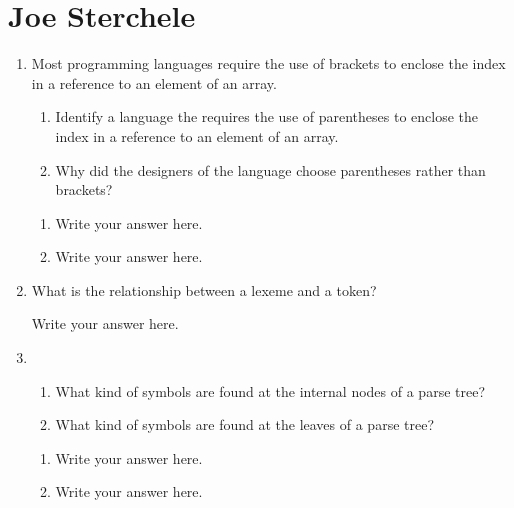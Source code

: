 
\chapter{Joe Sterchele}

\begin{enumerate}
  \item Most programming languages require the use of brackets to
    enclose the index in a reference to an element of an array.
  \begin{enumerate}
    \item Identify a language the requires the use of parentheses
      to enclose the index in a reference to an element of an array.
    \item Why did the designers of the language choose parentheses
      rather than brackets?
    \end{enumerate}

  \begin{answer}

  \begin{enumerate}
    \item Write your answer here.
    \item Write your answer here.
    \end{enumerate}

    \end{answer}
    
  \item What is the relationship between a lexeme and a token?

  \begin{answer}

    Write your answer here.

    \end{answer}

  \item
  \begin{enumerate}
    \item What kind of symbols are found at the internal nodes of a
      parse tree?
    \item What kind of symbols are found at the leaves of a parse tree?
    \end{enumerate}

  \begin{answer}

  \begin{enumerate}
    \item Write your answer here.
    \item Write your answer here.
    \end{enumerate}


\end{answer}
\end{enumerate}
